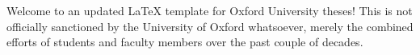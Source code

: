 

Welcome to an updated \gls{LaTeX} template for Oxford University theses! This is not officially sanctioned by the University of Oxford whatsoever, merely the combined efforts of students and faculty members over the past couple of decades.\\

\lipsum[1]


